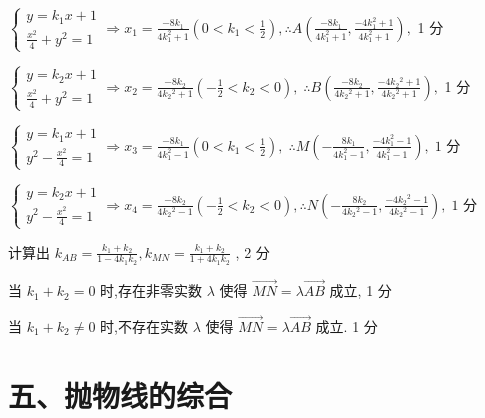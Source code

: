 \documentclass[10pt]{article}
\begin{document}
\(\left\{  {\begin{array}{l} y = {k}_{1}x + 1 \\  \frac{{x}^{2}}{4} + {y}^{2} = 1 \end{array} \Rightarrow  {x}_{1} = \frac{-8{k}_{1}}{4{k}_{1}^{2} + 1}\left( {0 < {k}_{1} < \frac{1}{2}}\right) ,\therefore A\left( {\frac{-8{k}_{1}}{4{k}_{1}^{2} + 1},\frac{-4{k}_{1}^{2} + 1}{4{k}_{1}^{2} + 1}}\right) ,}\right.\) 1 分

\(\left\{  {\begin{array}{l} y = {k}_{2}x + 1 \\  \frac{{x}^{2}}{4} + {y}^{2} = 1 \end{array} \Rightarrow  {x}_{2} = \frac{-8{k}_{2}}{4{k}_{2}{}^{2} + 1}\left( {-\frac{1}{2} < {k}_{2} < 0}\right) ,\;\therefore B\left( {\frac{-8{k}_{2}}{4{k}_{2}{}^{2} + 1},\frac{-4{k}_{2}{}^{2} + 1}{4{k}_{2}{}^{2} + 1}}\right) ,}\right.\) 1 分

\(\left\{  {\begin{array}{l} y = {k}_{1}x + 1 \\  {y}^{2} - \frac{{x}^{2}}{4} = 1 \end{array} \Rightarrow  {x}_{3} = \frac{-8{k}_{1}}{4{k}_{1}^{2} - 1}\left( {0 < {k}_{1} < \frac{1}{2}}\right) ,\;\therefore M\left( {-\frac{8{k}_{1}}{4{k}_{1}^{2} - 1},\frac{-4{k}_{1}^{2} - 1}{4{k}_{1}^{2} - 1}}\right) ,\;1}\right.\) 分

\(\left\{  {\begin{array}{l} y = {k}_{2}x + 1 \\  {y}^{2} - \frac{{x}^{2}}{4} = 1 \end{array} \Rightarrow  {x}_{4} = \frac{-8{k}_{2}}{4{k}_{2}{}^{2} - 1}\left( {-\frac{1}{2} < {k}_{2} < 0}\right) ,\therefore N\left( {-\frac{8{k}_{2}}{4{k}_{2}{}^{2} - 1},\frac{-4{k}_{2}{}^{2} - 1}{4{k}_{2}{}^{2} - 1}}\right) ,\;1}\right.\) 分

计算出 \({k}_{AB} = \frac{{k}_{1} + {k}_{2}}{1 - 4{k}_{1}{k}_{2}},{k}_{MN} = \frac{{k}_{1} + {k}_{2}}{1 + 4{k}_{1}{k}_{2}}\) , 2 分

当 \({k}_{1} + {k}_{2} = 0\) 时,存在非零实数 \(\lambda\) 使得 \(\overrightarrow{MN} = \lambda \overrightarrow{AB}\) 成立, 1 分

当 \({k}_{1} + {k}_{2} \neq  0\) 时,不存在实数 \(\lambda\) 使得 \(\overrightarrow{MN} = \lambda \overrightarrow{AB}\) 成立. 1 分

\section*{五、抛物线的综合}
\end{document}
